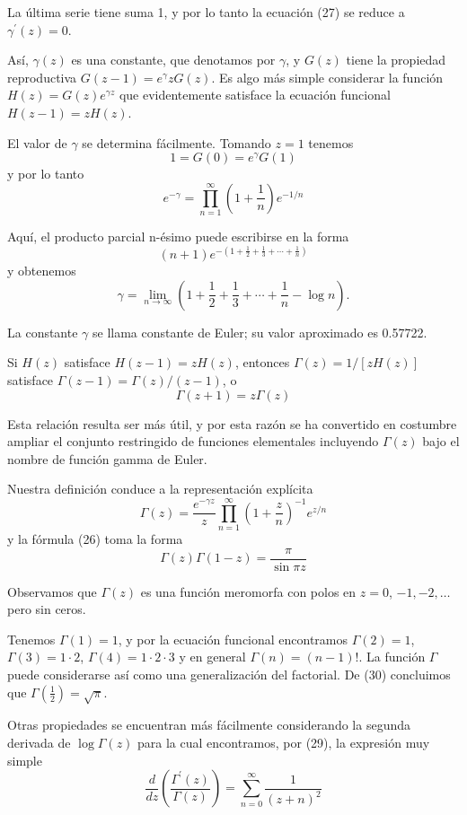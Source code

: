 \documentclass{article}
\theoremstyle{nonumberplain}
\begin{document}
\begin{theorem}[7]
La última serie tiene suma 1, y por lo tanto la ecuación (27) se reduce a \( \gamma^{\prime}(z)=0 \).

Así, \( \gamma(z) \) es una constante, que denotamos por \( \gamma \), y \( G(z) \) tiene la propiedad reproductiva \( G(z-1)=e^{\gamma} z G(z) \). Es algo más simple considerar la función \( H(z)=G(z) e^{\gamma z} \) que evidentemente satisface la ecuación funcional \( H(z-1)=z H(z) \).

El valor de \( \gamma \) se determina fácilmente. Tomando \( z=1 \) tenemos
\[
1=G(0)=e^{\gamma} G(1)
\]
y por lo tanto
\[
e^{-\gamma}=\prod_{n=1}^{\infty}\left(1+\frac{1}{n}\right) e^{-1 / n}
\]

Aquí, el producto parcial n-ésimo puede escribirse en la forma
\[
(n+1) e^{-(1+\frac{1}{2}+\frac{1}{3}+\cdots+\frac{1}{n})}
\]
y obtenemos
\[
\gamma=\lim _{n \rightarrow \infty}\left(1+\frac{1}{2}+\frac{1}{3}+\cdots+\frac{1}{n}-\log n\right) .
\]

La constante \( \gamma \) se llama constante de Euler; su valor aproximado es 0.57722.

Si \( H(z) \) satisface \( H(z-1)=z H(z) \), entonces \( \Gamma(z)=1 /[z H(z)] \) satisface \( \Gamma(z-1)=\Gamma(z)/(z-1) \), o
\[
\Gamma(z+1)=z \Gamma(z)
\]

Esta relación resulta ser más útil, y por esta razón se ha convertido en costumbre ampliar el conjunto restringido de funciones elementales incluyendo \( \Gamma(z) \) bajo el nombre de función gamma de Euler.

Nuestra definición conduce a la representación explícita
\[
\Gamma(z)=\frac{e^{-\gamma z}}{z} \prod_{n=1}^{\infty}\left(1+\frac{z}{n}\right)^{-1} e^{z / n}
\]
y la fórmula (26) toma la forma
\[
\Gamma(z) \Gamma(1-z)=\frac{\pi}{\sin \pi z}
\]

Observamos que \( \Gamma(z) \) es una función meromorfa con polos en \( z=0 \), \( -1,-2, \ldots \) pero sin ceros.

Tenemos \( \Gamma(1)=1 \), y por la ecuación funcional encontramos \( \Gamma(2)=1 \), \( \Gamma(3)=1 \cdot 2 \), \( \Gamma(4)=1 \cdot 2 \cdot 3 \) y en general \( \Gamma(n)=(n-1)! \). La función \( \Gamma \) puede considerarse así como una generalización del factorial. De (30) concluimos que \( \Gamma\left(\frac{1}{2}\right)=\sqrt{\pi} \).

Otras propiedades se encuentran más fácilmente considerando la segunda derivada de \( \log \Gamma(z) \) para la cual encontramos, por (29), la expresión muy simple
\[
\frac{d}{d z}\left(\frac{\Gamma^{\prime}(z)}{\Gamma(z)}\right)=\sum_{n=0}^{\infty} \frac{1}{(z+n)^{2}}
\]


\end{theorem}
\end{document}
